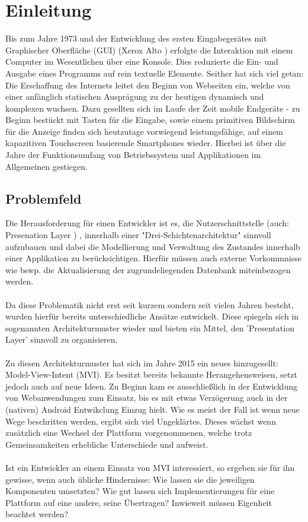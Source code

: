 \section{Einleitung}
\label{sec:einleitung}

Bis zum Jahre 1973 und der Entwicklung des ersten Eingabegerätes mit Graphischer Oberfläche (GUI) (Xerox Alto \cite{xeroxAlto}) erfolgte die Interaktion mit einem Computer im Wesentlichen über eine Konsole. Dies reduzierte die Ein- und Ausgabe eines Programms auf rein textuelle Elemente. Seither hat sich viel getan: Die Erschaffung des Internets leitet den Beginn von Webseiten ein, welche von einer anfänglich statischen Ausprägung zu der heutigen dynamisch und komplexen wuchsen. Dazu gesellten sich im Laufe der Zeit mobile Endgeräte - zu Beginn bestückt mit Tasten für die Eingabe, sowie einem primitiven Bildschirm für die Anzeige finden sich heutzutage vorwiegend leistungsfähige, auf einem kapazitiven Touchscreen basierende Smartphones wieder. Hierbei ist über die Jahre der Funktionsumfang von Betriebssystem und Applikationen im Allgemeinen gestiegen.

\subsection{Problemfeld}
\label{subsec:problemfeld}
Die Herausforderung für einen Entwickler ist es, die Nutzerschnittstelle (auch: Presenation Layer \cite{presentationLayerpatternsOfEnterpriseApplicationArchitectureMartinFowler}) ,
innerhalb einer "Drei-Schichtenarchitektur"
\cite{threeTierArchitectureDonaldWolfe2013}
sinnvoll aufzubauen und dabei die Modellierung und Verwaltung des Zustandes innerhalb einer Applikation zu berücksichtigen. Hierfür müssen auch externe Vorkommnisse wie bswp. die Aktualisierung der zugrundeliegenden Datenbank miteinbezogen werden.
\\\\
Da diese Problematik nicht erst seit kurzem sondern seit vielen Jahren besteht, wurden hierfür bereits unterschiedliche Ansätze entwickelt. Diese spiegeln sich in sogenannten Architekturmuster wieder und bieten ein Mittel, den 'Presentation Layer' sinnvoll zu organisieren.
\\\\
Zu diesen Architekturmuster hat sich im Jahre 2015 ein neues hinzugesellt: Model-View-Intent (MVI). Es besitzt bereits bekannte Herangehensweisen, setzt jedoch auch auf neue Ideen. Zu Beginn kam es ausschließlich in der Entwicklung von Webanwendungen zum Einsatz, bis es mit etwas Verzögerung auch in der (nativen) Android Entwikclung Einzug hielt. Wie es meist der Fall ist wenn neue Wege beschritten werden, ergibt sich viel Ungeklärtes. Dieses wächst wenn zusätzlich eine Wechsel der Plattform vorgenommenen, welche trotz Gemeinsamkeiten erhebliche Unterschiede und aufweist.
\\\\
Ist ein Entwickler an einem Einsatz von MVI interessiert, so ergeben sie für ihn gewisse, wenn auch übliche Hindernisse: Wie lassen sie die jeweiligen Komponenten umsetzten? Wie gut lassen sich Implementierungen für eine Plattform auf eine andere, seine Übertragen? Inwieweit müssen Eigenheit beachtet werden?  

